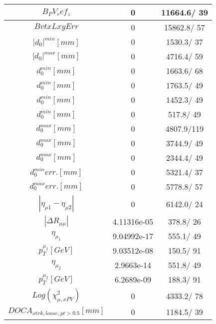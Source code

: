 \documentclass{article}
\begin{document}
\begin{table}[htbp]
\begin{center}
\begin{tabular}{c|c|c}
\hline
$B_PV_ref_z$ & 0 & 11664.6/ 39\\
\hline
$BvtxLxyErr$ & 0 & 15862.8/ 57\\
\hline
$|d_{0}|^{min} [mm]$ & 0 & 1530.3/ 37\\
\hline
$|d_{0}|^{max} [mm]$ & 0 & 4716.4/ 59\\
\hline
$d_{0}^{min} [mm]$ & 0 & 1663.6/ 68\\
\hline
$d_{0}^{min} [mm]$ & 0 & 1763.5/ 49\\
\hline
$d_{0}^{min} [mm]$ & 0 & 1452.3/ 49\\
\hline
$d_{0}^{min} [mm]$ & 0 & 517.8/ 49\\
\hline
$d_{0}^{max} [mm]$ & 0 & 4807.9/119\\
\hline
$d_{0}^{max} [mm]$ & 0 & 3744.9/ 49\\
\hline
$d_{0}^{max} [mm]$ & 0 & 2344.4/ 49\\
\hline
$d_{0}^{min} err. [mm]$ & 0 & 5321.4/ 37\\
\hline
$d_{0}^{max} err. [mm]$ & 0 & 5778.8/ 57\\
\hline
$|\eta_{\mu1}-\eta_{\mu2}|$ & 0 & 6142.0/ 24\\
\hline
$|\Delta R_{\mu \mu}|$ & 4.11316e-05 & 378.8/ 26\\
\hline
$\eta_{\mu_{1}}$ & 9.04992e-17 & 555.1/ 49\\
\hline
$p_{T}^{\mu_{1}} [GeV]$ & 9.03512e-08 & 150.5/ 91\\
\hline
$\eta_{\mu_{2}}$ & 2.9663e-14 & 551.8/ 49\\
\hline
$p_{T}^{\mu_{2}} [GeV]$ & 6.2689e-09 & 188.3/ 91\\
\hline
$Log(\chi^{2}_{\mu,xPV})$ & 0 & 4333.2/ 78\\
\hline
$DOCA_{xtrk, loose, pt>0.5} [mm]$ & 0 & 1184.5/ 39\\
\hline
\end{tabular}
\end{center}
\end{table}
\end{document}
